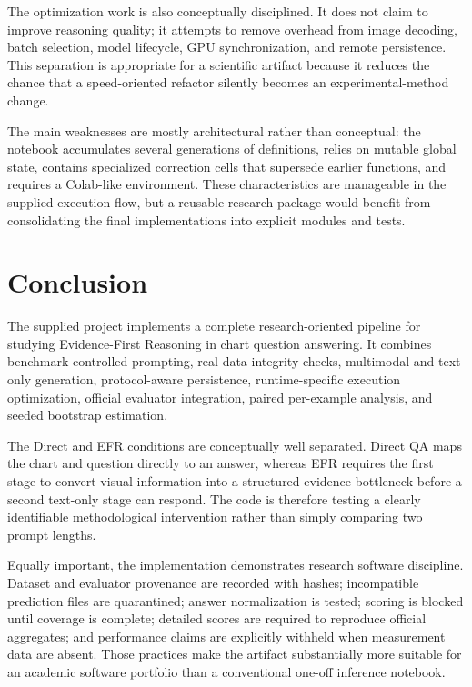 \documentclass[11pt,a4paper]{article}
\begin{document}
The optimization work is also conceptually disciplined. It does not claim to improve reasoning quality; it attempts to remove overhead from image decoding, batch selection, model lifecycle, GPU synchronization, and remote persistence. This separation is appropriate for a scientific artifact because it reduces the chance that a speed-oriented refactor silently becomes an experimental-method change.

The main weaknesses are mostly architectural rather than conceptual: the notebook accumulates several generations of definitions, relies on mutable global state, contains specialized correction cells that supersede earlier functions, and requires a Colab-like environment. These characteristics are manageable in the supplied execution flow, but a reusable research package would benefit from consolidating the final implementations into explicit modules and tests.

\section{Conclusion}
The supplied project implements a complete research-oriented pipeline for studying Evidence-First Reasoning in chart question answering. It combines benchmark-controlled prompting, real-data integrity checks, multimodal and text-only generation, protocol-aware persistence, runtime-specific execution optimization, official evaluator integration, paired per-example analysis, and seeded bootstrap estimation.

The Direct and EFR conditions are conceptually well separated. Direct QA maps the chart and question directly to an answer, whereas EFR requires the first stage to convert visual information into a structured evidence bottleneck before a second text-only stage can respond. The code is therefore testing a clearly identifiable methodological intervention rather than simply comparing two prompt lengths.

Equally important, the implementation demonstrates research software discipline. Dataset and evaluator provenance are recorded with hashes; incompatible prediction files are quarantined; answer normalization is tested; scoring is blocked until coverage is complete; detailed scores are required to reproduce official aggregates; and performance claims are explicitly withheld when measurement data are absent. Those practices make the artifact substantially more suitable for an academic software portfolio than a conventional one-off inference notebook.
\end{document}
